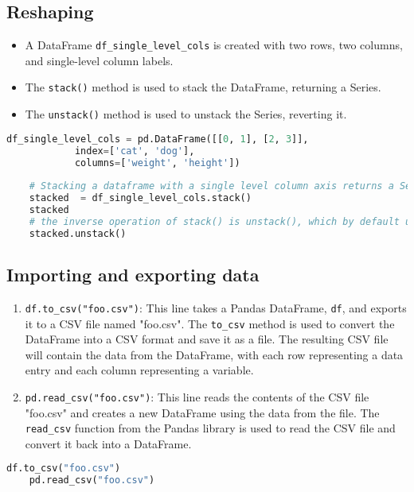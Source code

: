 \subsection{Reshaping}
\begin{itemize}
	\item A DataFrame \texttt{df\_single\_level\_cols} is created with two rows, two columns, and single-level column labels.
	\item The \texttt{stack()} method is used to stack the DataFrame, returning a Series.
	\item The \texttt{unstack()} method is used to unstack the Series, reverting it.
\end{itemize}


\begin{lstlisting}[language=Python]
	df_single_level_cols = pd.DataFrame([[0, 1], [2, 3]],
			index=['cat', 'dog'],
			columns=['weight', 'height'])
		
	# Stacking a dataframe with a single level column axis returns a Series:
	stacked  = df_single_level_cols.stack()
	stacked 
	# the inverse operation of stack() is unstack(), which by default unstacks the last level:
	stacked.unstack()
\end{lstlisting}


\subsection{Importing and exporting data}

\begin{enumerate}
	\item \texttt{df.to\_csv("foo.csv")}: This line takes a Pandas DataFrame, \texttt{df}, and exports it to a CSV file named "foo.csv". The \texttt{to\_csv} method is used to convert the DataFrame into a CSV format and save it as a file. The resulting CSV file will contain the data from the DataFrame, with each row representing a data entry and each column representing a variable.
	
	\item \texttt{pd.read\_csv("foo.csv")}: This line reads the contents of the CSV file "foo.csv" and creates a new DataFrame using the data from the file. The \texttt{read\_csv} function from the Pandas library is used to read the CSV file and convert it back into a DataFrame.
\end{enumerate}

\begin{lstlisting}[language=Python]
	df.to_csv("foo.csv")
	pd.read_csv("foo.csv")
\end{lstlisting}



